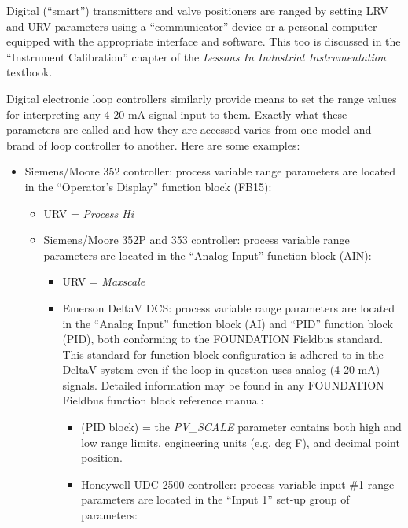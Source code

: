 Digital (``smart'') transmitters and valve positioners are ranged by setting LRV and URV parameters using a ``communicator'' device or a personal computer equipped with the appropriate interface and software.  This too is discussed in the ``Instrument Calibration'' chapter of the {\it Lessons In Industrial Instrumentation} textbook. 

\vskip 10pt

\filbreak

Digital electronic loop controllers similarly provide means to set the range values for interpreting any 4-20 mA signal input to them.  Exactly what these parameters are called and how they are accessed varies from one model and brand of loop controller to another.  Here are some examples:

\begin{itemize}
\item{} Siemens/Moore 352 controller: process variable range parameters are located in the ``Operator's Display'' function block (FB15):
\begin{itemize}

\item{} URV = {\it Process Hi}
\vskip 10pt
\item{} Siemens/Moore 352P and 353 controller: process variable range parameters are located in the ``Analog Input'' function block (AIN):
\begin{itemize}

\item{} URV = {\it Maxscale}
\vskip 10pt
\item{} Emerson DeltaV DCS: process variable range parameters are located in the ``Analog Input'' function block (AI) and ``PID'' function block (PID), both conforming to the FOUNDATION Fieldbus standard.  This standard for function block configuration is adhered to in the DeltaV system even if the loop in question uses analog (4-20 mA) signals.  Detailed information may be found in any FOUNDATION Fieldbus function block reference manual:
\begin{itemize}

\item{} (PID block) = the {\it PV\_SCALE} parameter contains both high and low range limits, engineering units (e.g. deg F), and decimal point position.
\vskip 10pt
\item{} Honeywell UDC 2500 controller: process variable input \#1 range parameters are located in the ``Input 1'' set-up group of parameters:
\begin{itemize}


\end{itemize}
\end{itemize}
\end{itemize}
\end{itemize}
\end{itemize}
